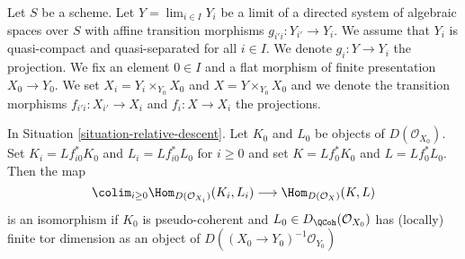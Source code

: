\begin{situation}
\label{situation-relative-descent}
Let $S$ be a scheme.
Let $Y = \lim_{i \in I} Y_i$ be a limit of a directed system of
algebraic spaces over $S$
with affine transition morphisms $g_{i'i} : Y_{i'} \to Y_i$.
We assume that $Y_i$ is quasi-compact and quasi-separated for all $i \in I$.
We denote $g_i : Y \to Y_i$ the projection. We fix an element $0 \in I$
and a flat morphism of finite presentation $X_0 \to Y_0$.
We set $X_i = Y_i \times_{Y_0} X_0$ and $X = Y \times_{Y_0} X_0$
and we denote the transition morphisms $f_{i'i} : X_{i'} \to X_i$
and $f_i : X \to X_i$ the projections.
\end{situation}

\begin{lemma}
\label{lemma-relative-descend-homomorphisms}
In Situation \ref{situation-relative-descent}.
Let $K_0$ and $L_0$ be objects of $D(\mathcal{O}_{X_0})$.
Set $K_i = Lf_{i0}^*K_0$ and $L_i = Lf_{i0}^*L_0$ for $i \geq 0$
and set $K = Lf_0^*K_0$ and $L = Lf_0^*L_0$. Then the map
$$
\colim_{i \geq 0} \Hom_{D(\mathcal{O}_{X_i})}(K_i, L_i)
\longrightarrow
\Hom_{D(\mathcal{O}_X)}(K, L)
$$
is an isomorphism if $K_0$ is pseudo-coherent and
$L_0 \in D_\QCoh(\mathcal{O}_{X_0})$ has (locally)
finite tor dimension as an object of
$D((X_0 \to Y_0)^{-1}\mathcal{O}_{Y_0})$
\end{lemma}

